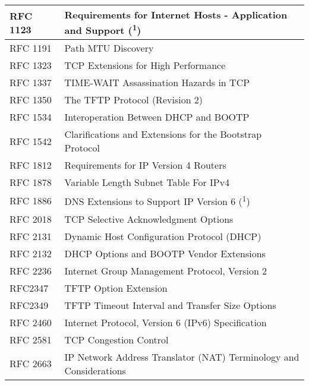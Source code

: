\begin{longtable}{ | l | p{15cm} | }
RFC 1123 &
Requirements for Internet Hosts - Application and Support (\textsuperscript{1}) \\ \hline

RFC 1191 &
Path MTU Discovery \\ \hline

RFC 1323 &
TCP Extensions for High Performance \\ \hline

RFC 1337 &
TIME-WAIT Assassination Hazards in TCP \\ \hline

RFC 1350 &
The TFTP Protocol (Revision 2) \\ \hline

RFC 1534 &
Interoperation Between DHCP and BOOTP \\ \hline

RFC 1542 &
Clarifications and Extensions for the Bootstrap Protocol \\ \hline

RFC 1812 &
Requirements for IP Version 4 Routers \\ \hline

RFC 1878 &
Variable Length Subnet Table For IPv4 \\ \hline

RFC 1886 &
DNS Extensions to Support IP Version 6 (\textsuperscript{1}) \\ \hline

RFC 2018 &
TCP Selective Acknowledgment Options \\ \hline

RFC 2131 &
Dynamic Host Configuration Protocol (DHCP) \\ \hline

RFC 2132 &
DHCP Options and BOOTP Vendor Extensions \\ \hline

RFC 2236 &
Internet Group Management Protocol, Version 2 \\ \hline

RFC2347 &
TFTP Option Extension \\ \hline

RFC2349 &
TFTP Timeout Interval and Transfer Size Options \\ \hline

RFC 2460 &
Internet Protocol, Version 6 (IPv6) Specification \\ \hline

RFC 2581 &
TCP Congestion Control \\ \hline

RFC 2663 &
IP Network Address Translator (NAT) Terminology and Considerations \\ \hline


\end{longtable}
